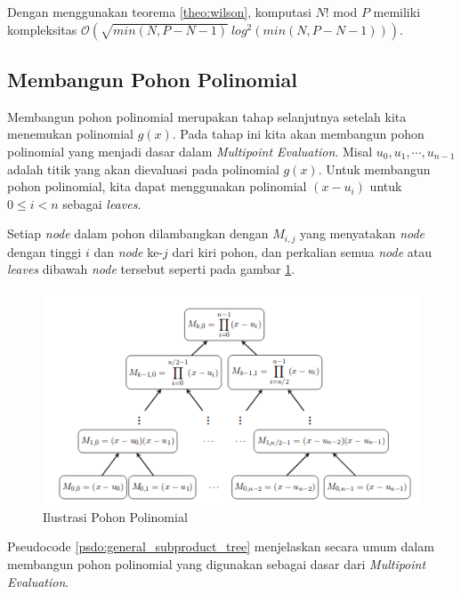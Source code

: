 Dengan menggunakan teorema \ref{theo:wilson}, komputasi $ N! $  mod $ P $ memiliki kompleksitas $ \mathcal{O}{(\sqrt{min(N,P-N-1)}\ log^2 (min(N,P-N-1)) )}$.

\subsection{ Membangun Pohon Polinomial}
\label{sec:membangun_pohon_polinomial}
Membangun pohon polinomial merupakan tahap selanjutnya setelah kita menemukan polinomial $ g(x) $. Pada tahap ini kita akan membangun pohon polinomial yang menjadi dasar dalam \textit{Multipoint Evaluation}. Misal $ u_0, u_1, \cdots , u_{n-1} $ adalah titik yang akan dievaluasi pada polinomial $ g(x) $. Untuk membangun pohon polinomial, kita dapat menggunakan polinomial $( x - u_i) $ untuk $ 0 \leq i < n $ sebagai \textit{leaves}.

Setiap \textit{node} dalam pohon dilambangkan dengan $ M_{i,j} $ yang menyatakan \textit{node} dengan tinggi $ i $ dan \textit{node} ke-$j$ dari kiri pohon, dan perkalian semua \textit{node} atau \textit{leaves} dibawah \textit{node} tersebut seperti pada gambar \ref{fig:ilustrasi-pohon-polinomial}. 

\begin{figure}
	\Centering
	\includegraphics [scale=0.5]{bab2/img/ilustrasi-pohon-polinomial}
	\caption {Ilustrasi Pohon Polinomial}
	\label {fig:ilustrasi-pohon-polinomial}
\end{figure}

Pseudocode \ref{psdo:general_subproduct_tree} menjelaskan secara umum dalam membangun pohon polinomial yang digunakan sebagai dasar dari \textit{Multipoint Evaluation}.

